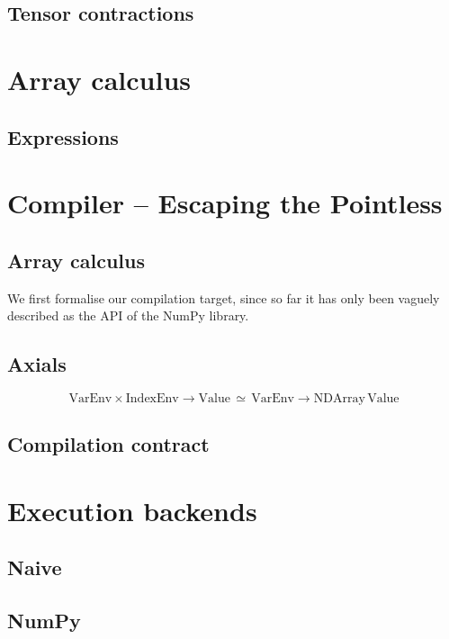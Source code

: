\subsection{Tensor contractions}

\section{Array calculus}

\subsection{Expressions}

\section{Compiler -- Escaping the Pointless}

\subsection{Array calculus}

We first formalise our compilation target, since so far it has only been vaguely described as the API of the NumPy library.

\subsection{Axials}

$$ \mathrm{VarEnv} \times \mathrm{IndexEnv} \to \mathrm{Value} \,\simeq\, \mathrm{VarEnv} \to \mathrm{NDArray}\, \mathrm{Value} $$

\subsection{Compilation contract}

\section{Execution backends}

\subsection{Naive}

\subsection{NumPy}

